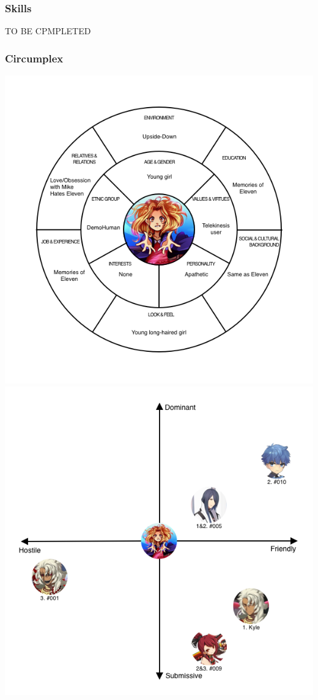 \subsubsection{Skills}
TO BE CPMPLETED

\subsubsection{Circumplex}
\begin{center}
	\includegraphics[width=0.76\linewidth]{images/circumplex/bad_eleven_circumplex.png}
	\includegraphics[width=0.76\linewidth]{images/map_of_relations/bad_eleven_map_of_relations.png}
\end{center}


